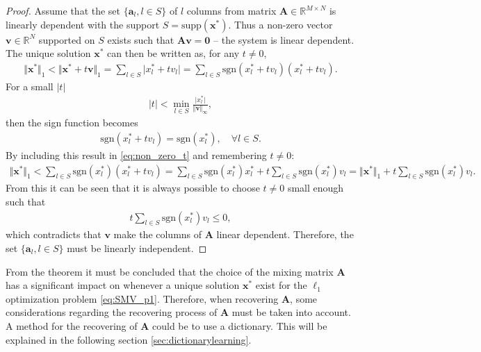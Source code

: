 \begin{proof}
Assume that the set $\lbrace \mathbf{a}_l, l \in S \rbrace$ of $l$ columns from matrix $\mathbf{A} \in \mathbb{R}^{M \times N}$ is linearly dependent with the support $S = \text{supp}(\mathbf{x}^\ast)$.
Thus a non-zero vector $\mathbf{v} \in \mathbb{R}^N$ supported on $S$ exists such that $\mathbf{Av} = \textbf{0}$ -- the system is linear dependent. The unique solution $\mathbf{x}^\ast$ can then be written as, for any $t \neq 0$,
\begin{align}\label{eq:non_zero_t}
\Vert \mathbf{x}^\ast \Vert_1 < \Vert \mathbf{x}^\ast + t \mathbf{v} \Vert_1 = \sum_{l \in S} \vert x_l^\ast + t v_l \vert = \sum_{l \in S} \text{sgn}(x_l^\ast + t v_l )(x_l^\ast + t v_l ).
\end{align}
For a small $|t|$
\begin{align*}
|t| < \min_{l \in S} \frac{\vert x_l^\ast \vert}{\Vert \mathbf{v} \Vert_{\infty}},
\end{align*}
then the sign function becomes
\begin{align*}
\text{sgn}(x_l^\ast + t v_l) = \text{sgn}(x_l^\ast), \quad \forall l \in S.
\end{align*}
By including this result in \eqref{eq:non_zero_t} and remembering $t \neq 0$:
\begin{align*}
\Vert \textbf{x}^{\ast} \Vert_1 < \sum_{l \in S} \text{sgn}(x_l^{\ast})(x_l^{\ast} + t v_l ) = \sum_{l \in S} \text{sgn}(x_l^{\ast})x_l^{\ast} + t \sum_{l \in S} \text{sgn}(x_l^{\ast})v_l = \Vert \textbf{x}^{\ast} \Vert_1 + t \sum_{l \in S} \text{sgn}(x_l^{\ast})v_l.
\end{align*}
From this it can be seen that it is always possible to choose $t \neq 0$ small enough such that 
\begin{align*}
t \sum_{l \in S} \text{sgn}(x_l^\ast)v_l \leq 0,
\end{align*}
which contradicts that $\mathbf{v}$ make the columns of $\mathbf{A}$ linear dependent. 
Therefore, the set $\lbrace \mathbf{a}_l, l \in S \rbrace$ must be linearly independent.
\end{proof}
From the theorem it must be concluded that the choice of the mixing matrix $\mathbf{A}$ has a significant impact on whenever a unique solution $\mathbf{x}^\ast$ exist for the $\ell_1$ optimization problem \eqref{eq:SMV_p1}. Therefore, when recovering $\mathbf{A}$, some considerations regarding the recovering process of $\mathbf{A}$ must be taken into account. A method for the recovering of $\mathbf{A}$ could be to use a dictionary. This will be explained in the following section \ref{sec:dictionarylearning}.

